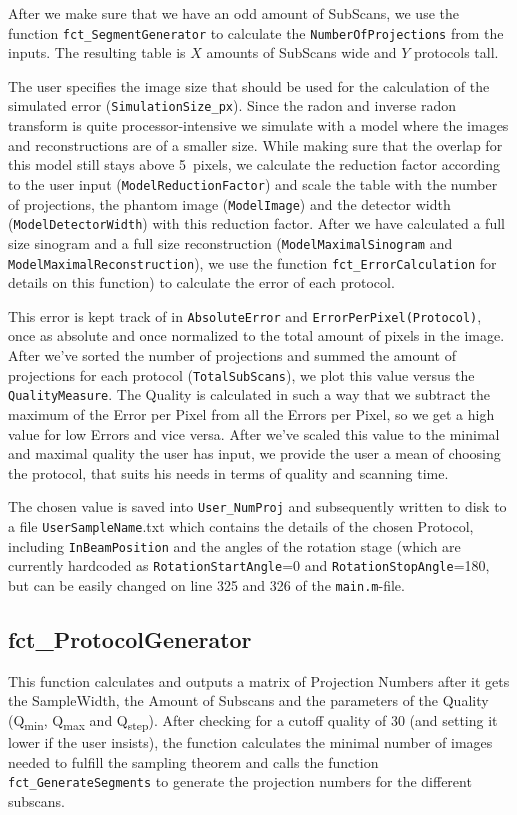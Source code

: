 \documentclass[a4paper]{scrartcl}
\begin{document}
After we make sure that we have an odd amount of SubScans, we use the function \verb+fct_SegmentGenerator+ to calculate the \verb+NumberOfProjections+ from the inputs. The resulting table is $X$ amounts of SubScans wide and $Y$ protocols tall.

The user specifies the image size that should be used for the calculation of the simulated error (\verb+SimulationSize_px+). Since the radon and inverse radon transform is quite processor-intensive we simulate with a model where the images and reconstructions are of a smaller size. While making sure that the overlap for this model still stays above 5~pixels, we calculate the reduction factor according to the user input (\verb+ModelReductionFactor+) and scale the table with the number of projections, the phantom image (\verb+ModelImage+) and the detector width (\verb+ModelDetectorWidth+) with this reduction factor. After we have calculated a full size sinogram and a full size reconstruction (\verb+ModelMaximalSinogram+ and \verb+ModelMaximalReconstruction+), we use the function \verb+fct_ErrorCalculation+ for details on this function) to calculate the error of each protocol.

This error is kept track of in \verb+AbsoluteError+ and \verb+ErrorPerPixel(Protocol)+, once as absolute and once normalized to the total amount of pixels in the image. After we've sorted the number of projections and summed the amount of projections for each protocol (\verb+TotalSubScans+), we plot this value versus the \verb+QualityMeasure+. The Quality is calculated in such a way that we subtract the maximum of the Error per Pixel from all the Errors per Pixel, so we get a high value for low Errors and vice versa. After we've scaled this value to the minimal and maximal quality the user has input, we provide the user a mean of choosing the protocol, that suits his needs in terms of quality and scanning time.

The chosen value is saved into \verb+User_NumProj+ and subsequently written to disk to a file \verb+UserSampleName+.txt which contains the details of the chosen Protocol, including \verb+InBeamPosition+ and the angles of the rotation stage (which are currently hardcoded as \verb+RotationStartAngle+=\si{0}{\degree} and \verb+RotationStopAngle+=\si{180}{\degree}, but can be easily changed on line 325 and 326 of the \verb+main.m+-file.

\subsection{fct_ProtocolGenerator}
This function calculates and outputs a matrix of Projection Numbers after it gets the SampleWidth, the Amount of Subscans and the parameters of the Quality (Q\textsubscript{min}, Q\textsubscript{max} and Q\textsubscript{step}). After checking for a cutoff quality of \si{30}{\percent} (and setting it lower if the user insists), the function calculates the minimal number of images needed to fulfill the sampling theorem and calls the function \verb+fct_GenerateSegments+ to generate the projection numbers for the different subscans.
\end{document}
